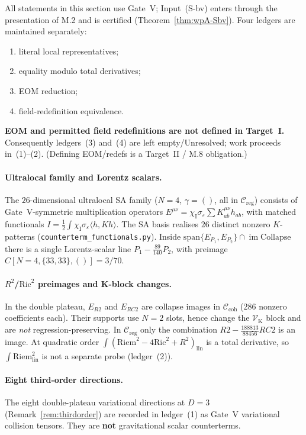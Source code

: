 \documentclass{article}
\theoremstyle{remark}
\newcommand{\sigeps}{\sigma_\varepsilon}
\newcommand{\chiI}{\chi_{\mathrm I}}
\newcommand{\Ccoh}{\mathcal C_{\mathrm{coh}}}
\newcommand{\Creg}{\mathcal C_{\mathrm{reg}}}
\newcommand{\Coll}{\mathrm{Collapse}}
\begin{document}
All statements in this section use Gate~V; Input~(S-bv) enters through the presentation of M.2 and is certified (Theorem~\ref{thm:wpA-Sbv}).
Four ledgers are maintained separately:
\begin{enumerate}
\item literal local representatives;
\item equality modulo total derivatives;
\item EOM reduction;
\item field-redefinition equivalence.
\end{enumerate}
\textbf{EOM and permitted field redefinitions are not defined in Target~I.}
Consequently ledgers~(3) and~(4) are left empty/Unresolved; work proceeds in~(1)--(2).
(Defining EOM/redefs is a Target~II / M.8 obligation.)

\paragraph{Ultralocal family and Lorentz scalars.}
The $26$-dimensional ultralocal SA family ($N=4$, $\gamma=()$, all in $\Creg$) consists of Gate~V-symmetric multiplication operators
$E^{\mu\nu}=\chiI\sigeps\sum K^{\mu\nu}_{ab}h_{ab}$, with matched functionals $I=\tfrac12\int\chiI\sigeps\langle h,Kh\rangle$.
The SA basis realises $26$ distinct nonzero $K$-patterns (\texttt{counterterm\_functionals.py}).
Inside $\mathrm{span}\{E_{P_1},E_{P_2}\}\cap\operatorname{im}\Coll$ there is a single Lorentz-scalar line $P_1-\tfrac{89}{140}P_2$, with preimage $C[N=4,\{33,33\},()]=3/70$.

\paragraph{$R^2$/$\mathrm{Ric}^2$ preimages and K-block changes.}
In the double plateau, $E_{R2}$ and $E_{RC2}$ are collapse images in $\Ccoh$ ($286$ nonzero coefficients each).
Their supports use $N=2$ slots, hence change the $\mathcal V_{\mathrm K}$ block and are \emph{not} regression-preserving.
In $\Creg$ only the combination $R2-\tfrac{188813}{88456}RC2$ is an image.
At quadratic order $\int(\mathrm{Riem}^2-4\mathrm{Ric}^2+R^2)_{\mathrm{lin}}$ is a total derivative, so $\int\mathrm{Riem}_{\mathrm{lin}}^2$ is not a separate probe (ledger~(2)).

\paragraph{Eight third-order directions.}
The eight double-plateau variational directions at $D=3$ (Remark~\ref{rem:thirdorder}) are recorded in ledger~(1) as Gate~V variational collision tensors.
They are \textbf{not} gravitational scalar counterterms.
\end{document}
